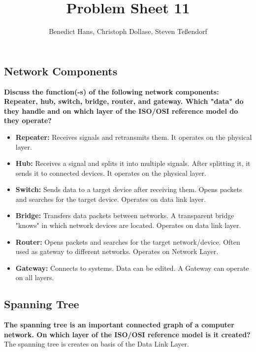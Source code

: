 \documentclass[a4paper,12pt]{article}
\author{Benedict Hans, Christoph Dollase, Steven Te\ss endorf}
\title{ \textbf{Problem Sheet 11}}
\begin{document}
	 
	\maketitle	 %
	
	\subsection{Network Components}
    \textbf{Discuss the function(-s) of the following network components: Repeater, hub, switch, bridge, router, 
    and gateway. Which "data" do they handle and on which layer of the ISO/OSI reference model do they operate?}
    \begin{itemize}[itemsep=0pt]
        \item \textbf{Repeater:} Receives signals and retransmits them. It operates on the physical layer.
        \item \textbf{Hub:} Receives a signal and splits it into multiple signals. After splitting it, it sends it
            to connected devices. It operates on the physical layer.
        \item \textbf{Switch:} Sends data to a target device after receiving them. Opens packets and searches for
            the target device. Operates on data link layer.
        \item \textbf{Bridge:} Transfers data packets between networks. A transparent bridge "knows" in which
            network devices are located. Operates on data link layer.
        \item \textbf{Router:} Opens packets and searches for the target network/device. Often used as gateway
            to different networks. Operates on Network Layer.
        \item \textbf{Gateway:} Connects to systems. Data can be edited. A Gateway can operate on all layers.
    \end{itemize}
	
	
	\subsection{Spanning Tree}
	\textbf{The spanning tree is an important connected graph of a computer network. On which layer of the ISO/OSI
    reference model is it created?} \newline
    The spanning tree is creates on basis of the Data Link Layer. \newline
    \newline
\end{document}
